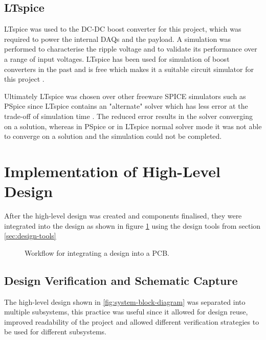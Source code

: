 \documentclass{report}
\newcommand*{\secref}[1]{section \hyperref[{#1}]{\ref*{#1} \nameref*{#1}}}
\begin{document}
\subsection{LTspice}

LTspice was used to the DC-DC boost converter for this project, which was required to power the internal DAQs and the payload. A simulation was performed to characterise the ripple voltage and to validate its performance over a range of input voltages. LTspice has been used for simulation of boost converters in the past and is free which makes it a suitable circuit simulator for this project \cite{giesselmann2019modeling}.

Ultimately LTspice was chosen over other freeware SPICE simulators such as PSpice since LTspice contains an "alternate" solver which has less error at the trade-off of simulation time \cite{ltspice2022}. The reduced error results in the solver converging on a solution, whereas in PSpice or in LTspice normal solver mode it was not able to converge on a solution and the simulation could not be completed.

\section{Implementation of High-Level Design}

After the high-level design was created and components finalised, they were integrated into the design as shown in figure \ref{fig:implementation-workflow} using the design tools from \secref{sec:design-tools}

\begin{figure}[H]
  \centering
  
  \caption{Workflow for integrating a design into a PCB.}
  \label{fig:implementation-workflow}
\end{figure}


\subsection{Design Verification and Schematic Capture}

The high-level design shown in \ref{fig:system-block-diagram} was separated into multiple subsystems, this practice was useful since it allowed for design reuse, improved readability of the project and allowed different verification strategies to be used for different subsystems.
\end{document}
